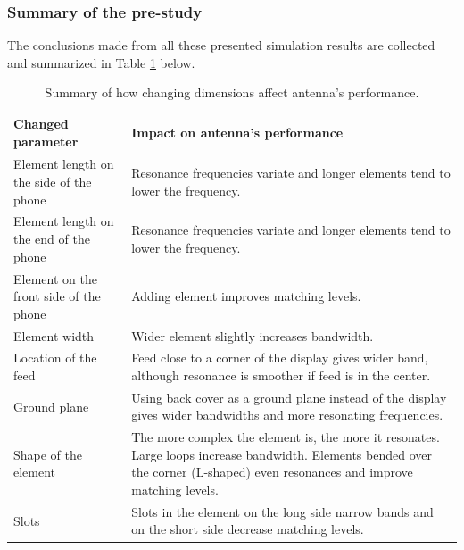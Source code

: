 \subsubsection{Summary of the pre-study}
\label{sec:pre_study_summary}
The conclusions made from all these presented simulation results are collected and summarized in Table \ref{tab:dimension_summary} below. 

\begin{table}[H]
    \centering
    \caption{Summary of how changing dimensions affect antenna's performance.}
    \label{tab:dimension_summary}
    \begin{tabular}{|p{}|p{}|}
        \hline
        \textbf{Changed parameter} & \textbf{Impact on antenna's performance} \\
        \hline
        Element length on the side of the phone & Resonance frequencies variate and longer elements tend to lower the frequency.\\
        \hline
        Element length on the end of the phone & Resonance frequencies variate and longer elements tend to lower the frequency.\\
        \hline
        Element on the front side of the phone & Adding element improves matching levels.\\
        \hline
        Element width & Wider element slightly increases bandwidth.\\
        \hline
        Location of the feed & Feed close to a corner of the display gives wider band, although resonance is smoother if feed is in the center.\\
        \hline
        Ground plane & Using back cover as a ground plane instead of the display gives wider bandwidths and more resonating frequencies.\\
        \hline
        Shape of the element & The more complex the element is, the more it resonates. Large loops increase bandwidth. Elements bended over the corner (L-shaped) even resonances and improve matching levels.\\
        \hline
        Slots & Slots in the element on the long side narrow bands and on the short side decrease matching levels.\\
        \hline
    \end{tabular}
\end{table} 

\clearpage